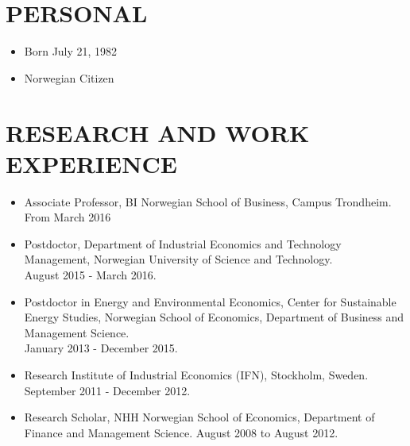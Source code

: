 \documentclass[margin]{res}
\begin{document}
  

\address{ mob:  +47 90 56 64 62 \\ email: jmaurit@gmail.com \\
website:  \url{jmaurit.github.io} }
                           
                        
\begin{resume} 

\section{PERSONAL}
\begin{itemize} 
\item[] Born July 21, 1982
\item[] Norwegian Citizen
\end{itemize}

\section{RESEARCH AND WORK EXPERIENCE}      
                  \begin{itemize}
                  \setlength{\itemsep}{10pt}
                  \item[] Associate Professor, BI Norwegian School of Business, Campus Trondheim. \\From March 2016
                  \item[] Postdoctor, Department of Industrial Economics and Technology Management, Norwegian University of Science and Technology. \\ August 2015 - March 2016. 
                  \item[] Postdoctor in Energy and Environmental Economics, Center for Sustainable Energy Studies, Norwegian School of Economics, Department of Business and Management Science. \\ January 2013 - December 2015.

                  
                  \item[]Research Institute of Industrial Economics (IFN), Stockholm, Sweden. \\ September 2011 - December 2012. 
                  
                  \item[] Research Scholar, NHH Norwegian School of Economics, Department of Finance and Management Science. August 2008 to August 2012.  
                  \end{itemize}
                   


\end{resume}
\end{document}
